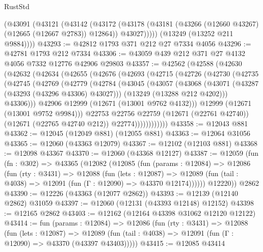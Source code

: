 \begin{lexlean}{RustStd}
\begin{coremodule}
        (@43091
          (@43121
            (@43142
              (@43172
                (@43178 (@43181 (@43266 (@12660 @43267) (@12665 (@12667 @2783)) @12864)) @43027)))))
        (@13249 (@13252 @211 @9884))))
@43293 := @42812 @1793 @371 @212 @27 @7334 @4056
@43296 := @42781 @1793 @212 @7334
@43306 := @43059 @439 @212 @371 @27 @4132 @4056 @7332 @12776 @42906 @29803
@43357 := @42562
    (@42588
      (@42630
        (@42632
          (@42634
            (@42655
              (@42676
                (@42693
                  (@42715
                    (@42726
                      (@42730
                        (@42735
                          (@42745
                            (@42769
                              (@42779
                                (@42784
                                  (@43045
                                    (@43057
                                      (@43068
                                        (@43071 (@43287 (@43293 (@43296 @43306) @43027)))
                                        (@13249 (@13288 @212 @4202)))
                                      @43306)))
                                @42906
                                @12999
                                (@12671 (@13001 @9762 @4132)))
                              @12999
                              (@12671 (@13001 @9752 @9984)))
                            @22753
                            @22756
                            @22759
                            (@12671 (@22761 @42740))
                            (@12671 (@22765 @42740 @212))
                            @22774))))))))))))
@43358 := @12043 @881
@43362 := @12045 (@12049 @881) (@12055 @881)
@43363 := @12064 @31056
@43365 := @12060 (@43363 @12079)
@43367 := @12102 (@12103 @881)
@43368 := @12098 @43367
@43370 := @12060 (@43368 @12127)
@43387 := @12059
    (fun (fn : @302) =>
    @43365
      (@12082
        (@12085
          (fun (params : @12084) =>
          @12086
            (fun (rty : @3431) =>
            @12088
              (fun (lets : @12087) =>
              @12089 (fun (tail : @4038) => @12091 (fun (Γ : @12090) => @43370 @12174))))))
        @12220))
    @2862
@43390 := @12226 (@43363 (@12077 @2862))
@43393 := @12139 (@12140 @2862) @31059
@43397 := @12060 (@12131 (@43393 @12148) @12152)
@43398 := @12165 @2862
@43403 := @12162 (@12164 @43398 @31062 @12120 @12122)
@43414 := fun (params : @12084) =>
  @12086
    (fun (rty : @3431) =>
    @12088
      (fun (lets : @12087) =>
      @12089 (fun (tail : @4038) => @12091 (fun (Γ : @12090) => @43370 (@43397 @43403)))))
@43415 := @12085 @43414

\end{coremodule}
\end{lexlean}
